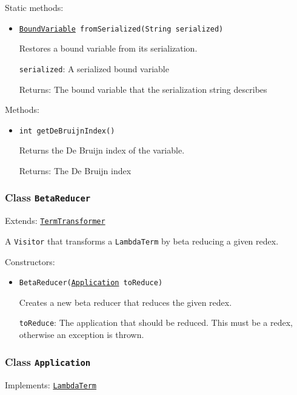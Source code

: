 Static methods:
\begin{itemize}
\item \texttt{\hyperref[type:edu.kit.wavelength.client.model.term.BoundVariable]{BoundVariable} fromSerialized(String serialized)}

Restores a bound variable from its serialization.

\texttt{serialized}: A serialized bound variable

Returns: The bound variable that the serialization string describes

\end{itemize}

Methods:
\begin{itemize}
\item \texttt{int getDeBruijnIndex()}

Returns the De Bruijn index of the variable.

Returns: The De Bruijn index

\end{itemize}

\subsubsection{Class \texttt{BetaReducer}}
\label{type:edu.kit.wavelength.client.model.term.BetaReducer}
Extends: \texttt{\hyperref[type:edu.kit.wavelength.client.model.term.TermTransformer]{TermTransformer}}

A \texttt{Visitor} that transforms a \texttt{LambdaTerm} by beta reducing a
 given redex.

Constructors:
\begin{itemize}
\item \texttt{BetaReducer(\hyperref[type:edu.kit.wavelength.client.model.term.Application]{Application} toReduce)}

Creates a new beta reducer that reduces the given redex.

\texttt{toReduce}: The application that should be reduced. This must be a redex,
            otherwise an exception is thrown.

\end{itemize}

\subsubsection{Class \texttt{Application}}
\label{type:edu.kit.wavelength.client.model.term.Application}
Implements: \texttt{\hyperref[type:edu.kit.wavelength.client.model.term.LambdaTerm]{LambdaTerm}}

